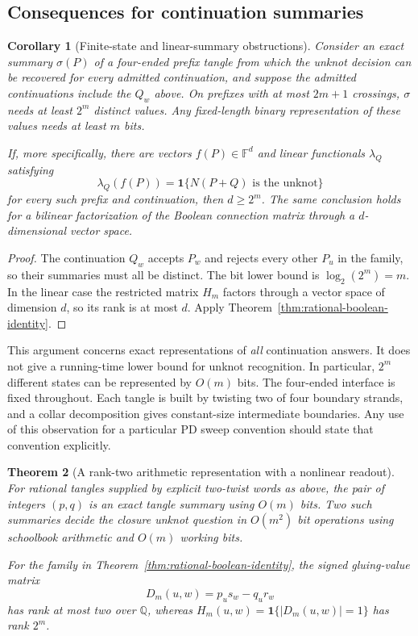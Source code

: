 \documentclass[11pt,a4paper]{article}
\newtheorem{theorem}{Theorem}[section]
\newtheorem{corollary}[theorem]{Corollary}
\theoremstyle{definition}
\theoremstyle{remark}
\numberwithin{equation}{section}
\begin{document}
\subsection{Consequences for continuation summaries}

\begin{corollary}[Finite-state and linear-summary obstructions]
\label{cor:rational-summary-obstructions}
Consider an exact summary $\sigma(P)$ of a four-ended prefix tangle from
which the unknot decision can be recovered for every admitted continuation,
and suppose the admitted continuations include the $Q_w$ above.
On prefixes with at most $2m+1$ crossings, $\sigma$ needs at least $2^m$
distinct values.  Any fixed-length binary representation of these values
needs at least $m$ bits.

If, more specifically, there are vectors $f(P)\in\mathbb F^d$ and
linear functionals $\lambda_Q$ satisfying
\[
 \lambda_Q(f(P))=\mathbf 1\{N(P+Q)\text{ is the unknot}\}
\]
for every such prefix and continuation, then $d\ge2^m$.
The same conclusion holds for a bilinear factorization of the Boolean
connection matrix through a $d$-dimensional vector space.
\end{corollary}

\begin{proof}
The continuation $Q_w$ accepts $P_w$ and rejects every other $P_u$ in the
family, so their summaries must all be distinct.  The bit lower bound is
$\log_2(2^m)=m$.  In the linear case the restricted matrix $H_m$ factors
through a vector space of dimension $d$, so its rank is at most $d$.
Apply Theorem~\ref{thm:rational-boolean-identity}.
\end{proof}

This argument concerns exact representations of \emph{all} continuation
answers.  It does not give a running-time lower bound for unknot recognition.
In particular, $2^m$ different states can be represented by $O(m)$ bits.
The four-ended interface is fixed throughout.  Each tangle is built by
twisting two of four boundary strands, and a collar decomposition gives
constant-size intermediate boundaries.  Any use of this observation for a
particular PD sweep convention should state that convention explicitly.

\begin{theorem}[A rank-two arithmetic representation with a nonlinear readout]
\label{thm:rational-arithmetic-representation}
For rational tangles supplied by explicit two-twist words as above,
the pair of integers $(p,q)$ is an exact tangle summary using $O(m)$ bits.
Two such summaries decide the closure unknot question in $O(m^2)$ bit
operations using schoolbook arithmetic and $O(m)$ working bits.

For the family in Theorem~\ref{thm:rational-boolean-identity}, the signed
gluing-value matrix
\[
 D_m(u,w)=p_u s_w-q_u r_w
\]
has rank at most two over $\mathbb Q$, whereas
$H_m(u,w)=\mathbf1\{|D_m(u,w)|=1\}$ has rank $2^m$.
\end{theorem}
\end{document}
